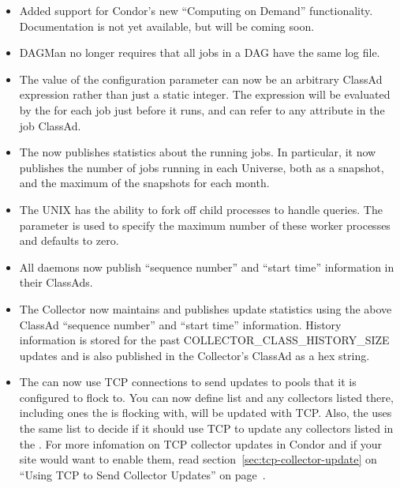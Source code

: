 \begin{itemize}
\item Added support for Condor's new ``Computing on Demand''
  functionality.
  Documentation is not yet available, but will be coming soon.

\item DAGMan no longer requires that all jobs in a DAG have the same
  log file.

\item The value of the  configuration
      parameter can now be an arbitrary ClassAd expression rather than
      just a static integer.  The expression will be evaluated by the
       for each job just before it runs, and can refer
      to any attribute in the job ClassAd.

\item The  now publishes statistics about the running
  jobs.  In particular, it now publishes the number of jobs running in
  each Universe, both as a snapshot, and the maximum of the snapshots
  for each month.

\item The UNIX  has the ability to fork off child
  processes to handle queries.  The 
  parameter is used to specify the maximum number of these worker
  processes and defaults to zero.

\item All daemons now publish ``sequence number'' and ``start time''
information in their ClassAds.

\item The Collector now maintains and publishes update statistics
using the above ClassAd ``sequence number'' and ``start time''
information.  History information is stored for the past
COLLECTOR\_CLASS\_HISTORY\_SIZE updates and is also published in the
Collector's ClassAd as a hex string.

\item The  can now use TCP connections to send updates
  to pools that it is configured to flock to.
  You can now define  list and any
  collectors listed there, including ones the  is
  flocking with, will be updated with TCP.
  Also, the  uses the same list to decide if it should
  use TCP to update any collectors listed in the
  .
  For more infomation on TCP collector updates in Condor and if your
  site would want to enable them, read
  section~\ref{sec:tcp-collector-update} on ``Using TCP to Send 
  Collector Updates'' on page~\pageref{sec:tcp-collector-update}.


\end{itemize}
